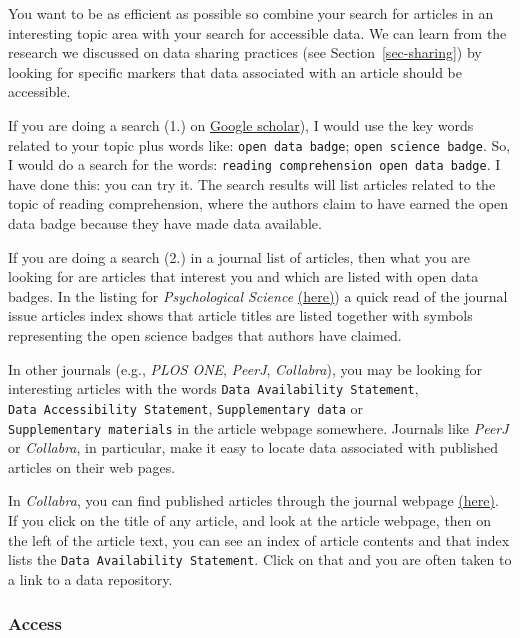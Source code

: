 \documentclass[
  letterpaper,
  DIV=11,
  numbers=noendperiod]{scrreprt}
\begin{document}
You want to be as efficient as possible so combine your search for
articles in an interesting topic area with your search for accessible
data. We can learn from the research we discussed on data sharing
practices (see Section~\ref{sec-sharing}) by looking for specific
markers that data associated with an article should be accessible.

If you are doing a search (1.) on
\href{https://scholar.google.com}{Google scholar}), I would use the key
words related to your topic plus words like: \texttt{open\ data\ badge};
\texttt{open\ science\ badge}. So, I would do a search for the words:
\texttt{reading\ comprehension\ open\ data\ badge}. I have done this:
you can try it. The search results will list articles related to the
topic of reading comprehension, where the authors claim to have earned
the open data badge because they have made data available.

If you are doing a search (2.) in a journal list of articles, then what
you are looking for are articles that interest you and which are listed
with open data badges. In the listing for \emph{Psychological Science}
\href{https://journals.sagepub.com/loi/PSS}{(here)}) a quick read of the
journal issue articles index shows that article titles are listed
together with symbols representing the open science badges that authors
have claimed.

In other journals (e.g., \emph{PLOS ONE}, \emph{PeerJ},
\emph{Collabra}), you may be looking for interesting articles with the
words \texttt{Data\ Availability\ Statement},
\texttt{Data\ Accessibility\ Statement}, \texttt{Supplementary\ data} or
\texttt{Supplementary\ materials} in the article webpage somewhere.
Journals like \emph{PeerJ} or \emph{Collabra}, in particular, make it
easy to locate data associated with published articles on their web
pages.

In \emph{Collabra}, you can find published articles through the journal
webpage \href{https://online.ucpress.edu/collabra}{(here)}. If you click
on the title of any article, and look at the article webpage, then on
the left of the article text, you can see an index of article contents
and that index lists the \texttt{Data\ Availability\ Statement}. Click
on that and you are often taken to a link to a data repository.

\hypertarget{sec-access}{%
\subsubsection{Access}\label{sec-access}}
\end{document}
